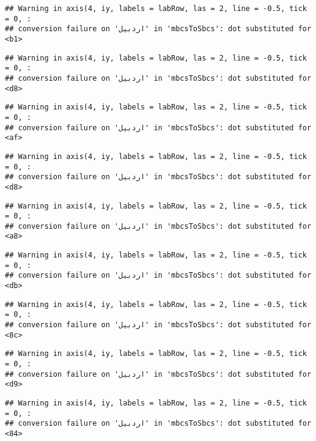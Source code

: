 \documentclass[
]{article}
\begin{document}
\begin{verbatim}
## Warning in axis(4, iy, labels = labRow, las = 2, line = -0.5, tick = 0, :
## conversion failure on 'اردبیل' in 'mbcsToSbcs': dot substituted for <b1>
\end{verbatim}

\begin{verbatim}
## Warning in axis(4, iy, labels = labRow, las = 2, line = -0.5, tick = 0, :
## conversion failure on 'اردبیل' in 'mbcsToSbcs': dot substituted for <d8>
\end{verbatim}

\begin{verbatim}
## Warning in axis(4, iy, labels = labRow, las = 2, line = -0.5, tick = 0, :
## conversion failure on 'اردبیل' in 'mbcsToSbcs': dot substituted for <af>
\end{verbatim}

\begin{verbatim}
## Warning in axis(4, iy, labels = labRow, las = 2, line = -0.5, tick = 0, :
## conversion failure on 'اردبیل' in 'mbcsToSbcs': dot substituted for <d8>
\end{verbatim}

\begin{verbatim}
## Warning in axis(4, iy, labels = labRow, las = 2, line = -0.5, tick = 0, :
## conversion failure on 'اردبیل' in 'mbcsToSbcs': dot substituted for <a8>
\end{verbatim}

\begin{verbatim}
## Warning in axis(4, iy, labels = labRow, las = 2, line = -0.5, tick = 0, :
## conversion failure on 'اردبیل' in 'mbcsToSbcs': dot substituted for <db>
\end{verbatim}

\begin{verbatim}
## Warning in axis(4, iy, labels = labRow, las = 2, line = -0.5, tick = 0, :
## conversion failure on 'اردبیل' in 'mbcsToSbcs': dot substituted for <8c>
\end{verbatim}

\begin{verbatim}
## Warning in axis(4, iy, labels = labRow, las = 2, line = -0.5, tick = 0, :
## conversion failure on 'اردبیل' in 'mbcsToSbcs': dot substituted for <d9>
\end{verbatim}

\begin{verbatim}
## Warning in axis(4, iy, labels = labRow, las = 2, line = -0.5, tick = 0, :
## conversion failure on 'اردبیل' in 'mbcsToSbcs': dot substituted for <84>
\end{verbatim}
\end{document}
